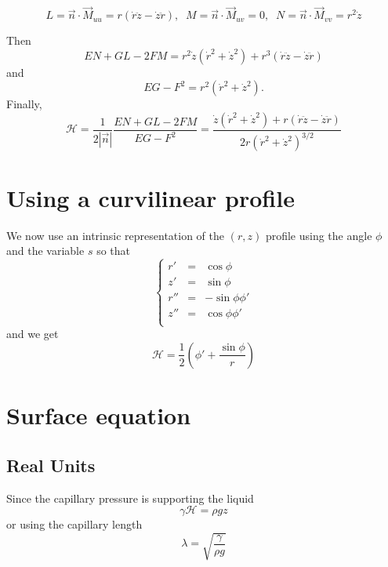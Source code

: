 \documentclass[aps,onecolumn]{revtex4}
\begin{document}
\begin{equation}
	L = \vec{n}\cdot\vec{M}_{uu} = r\left(\dot{r}\ddot{z}-\dot{z}\ddot{r}\right),\;\;
	M = \vec{n}\cdot\vec{M}_{uv} = 0,
	\;\;
	N = \vec{n}\cdot\vec{M}_{vv} = r^2\dot{z}
\end{equation}

Then
\begin{equation}
	EN + GL - 2FM = r^2 \dot{z} \left(\dot{r}^2 + \dot{z}^2\right) + r^3\left(\dot{r}\ddot{z}-\dot{z}\ddot{r}\right)
\end{equation}
and
\begin{equation}
	EG - F^2 = r^2 \left(\dot{r}^2 + \dot{z}^2\right).
\end{equation}
Finally, 
\begin{equation}
	\mathcal{H} = \dfrac{1}{2\left\vert\vec{n}\right\vert} \dfrac{EN + GL - 2FM}{EG - F^2} =
	\dfrac{\dot{z} \left(\dot{r}^2 + \dot{z}^2\right) + r\left(\dot{r}\ddot{z}-\dot{z}\ddot{r}\right)}
	{2r\left(\dot{r}^2 + \dot{z}^2\right)^{3/2}}
\end{equation}

\section{Using a curvilinear profile}
We now use an intrinsic representation of the $(r,z)$ profile using the
angle $\phi$ and the variable $s$ so that
\begin{equation}
\left\lbrace
	\begin{array}{rcl}
	r' & = & \cos \phi\\
	z' & = & \sin \phi\\
	r'' & = & -\sin\phi \phi'\\
	z'' & = & \cos\phi  \phi'\\
	\end{array}
\right.
\end{equation}
and we get
\begin{equation}
	\mathcal{H} = \frac{1}{2} \left(\phi'+\dfrac{\sin\phi}{r}\right)
\end{equation}

\section{Surface equation}
\subsection{Real Units}
Since the capillary pressure is supporting the liquid
\begin{equation}
	\gamma \mathcal{H} = \rho g z
\end{equation}
or using the capillary length
\begin{equation}
	\lambda = \sqrt{\dfrac{\gamma}{\rho g}}
\end{equation}
\end{document}
